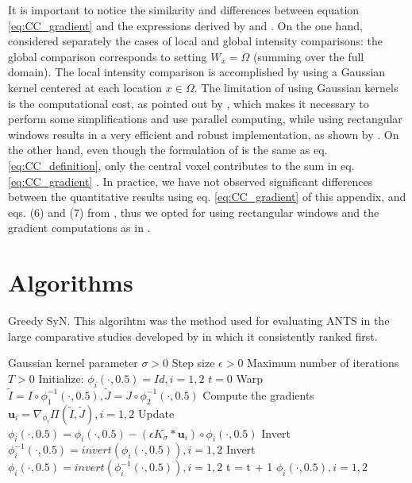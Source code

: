 It is important to notice the similarity and differences between equation \eqref{eq:CC_gradient} and the expressions derived by \cite{Hermosillo2004}
and \cite{Avants2008}. On the one hand, \cite{Hermosillo2004} considered separately the cases of local and global intensity comparisons: the global comparison corresponds to setting $W_{x} = \Omega$ (summing over the full domain). The local intensity comparison is accomplished by using a Gaussian kernel centered at each location $x\in\Omega$. The limitation of using Gaussian kernels is the computational cost, as pointed out by \cite{Hermosillo2004}, which makes it necessary to perform some simplifications and use parallel computing, while using rectangular windows results in a very efficient and robust implementation, as shown by \cite{Avants2008}. On the other hand, even though the formulation of \cite{Avants2008} is the same as eq. \eqref{eq:CC_definition}, only the central voxel contributes to the sum in eq. \eqref{eq:CC_gradient} \citep[see][eqs. 6, 7]{Avants2008}. In practice, we have not observed significant differences between the quantitative results using eq. \eqref{eq:CC_gradient} of this appendix, and eqs. (6) and (7) from \cite{Avants2008}, thus we opted for using rectangular windows and the gradient computations as in \cite{Avants2008}.

\section{Algorithms}\label{ap:Algorithms}
\begin{algorithm}[h!]
\caption{Greedy SyN. This algorihtm was the method used for evaluating ANTS \citep{Avants2011} in the large comparative studies developed by \cite{Klein2009, Klein2010} in which it consistently ranked first.}\label{alg:Greedy_SyN}
\begin{algorithmic}[1]
\REQUIRE Gaussian kernel parameter $\sigma>0$
\REQUIRE Step size $\epsilon>0$
\REQUIRE Maximum number of iterations $T>0$
\STATE Initialize: $\phi_{i}(\cdot, 0.5) = Id, i=1, 2$
\STATE $t=0$
\REPEAT
    \STATE Warp $\tilde{I}  = I \circ \phi_{1}^{-1}(\cdot, 0.5), \tilde{J} = J \circ \phi_{2}^{-1}(\cdot, 0.5)$
    \STATE Compute the gradients $\mathbf{u}_{i} = \nabla_{\phi_{i}} \Pi(\tilde{I}, \tilde{J}), i=1,2$
    \STATE Update $\phi_{i}(\cdot, 0.5) = \phi_{i}(\cdot, 0.5) - \left( \epsilon K_{\sigma} \ast \mathbf{u}_{i} \right) \circ \phi_{i}(\cdot, 0.5)$
    \STATE Invert $\phi_{i}^{-1}(\cdot, 0.5) = invert (\phi_{i}(\cdot, 0.5)), i=1, 2$
    \STATE Invert $\phi_{i}(\cdot, 0.5) = invert (\phi_{i}^{-1}(\cdot, 0.5)), i=1, 2$
    \STATE t = t + 1
\RETURN $\phi_{i}(\cdot, 0.5), i=1,2$
\end{algorithmic}
\end{algorithm}


